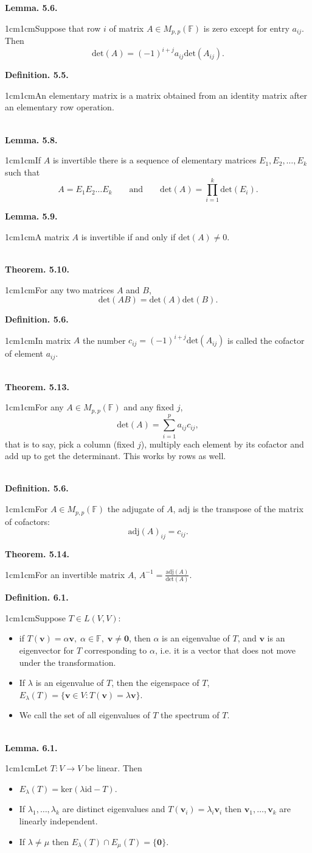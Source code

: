 \documentclass{article}
\newcommand{\vect}[1]{\mathbf{#1}}
\newcommand{\definition}[2]{\textbf{Definition. #1.}\begin{adjustwidth}{1cm}{1cm}#2\end{adjustwidth}}
\newcommand{\theorem}[2]{\textbf{Theorem. #1.}\begin{adjustwidth}{1cm}{1cm}#2\end{adjustwidth}}
\newcommand{\lemma}[2]{\textbf{Lemma. #1.}\begin{adjustwidth}{1cm}{1cm}#2\end{adjustwidth}}
\begin{document}
\lemma{5.6}{Suppose that row $i$ of matrix $A \in M_{p,p}(\mathbb{F})$ is zero except for entry $a_{ij}$. Then \[ \text{det}(A) = (-1)^{i+j} a_{ij} \text{det}(A_{ij}). \]}
\definition{5.5}{An elementary matrix is a matrix obtained from an identity matrix after an elementary row operation.}~\\
\lemma{5.8}{If $A$ is invertible there is a sequence of elementary matrices $E_1, E_2, \ldots, E_k$ such that \[ A = E_1 E_2 \ldots E_k \qquad \text{and} \qquad \text{det}(A) = \prod_{i=1}^k \text{det}(E_i). \]}\newpage
\lemma{5.9}{A matrix $A$ is invertible if and only if $\text{det}(A) \neq 0$.}~\\
\theorem{5.10}{For any two matrices $A$ and $B$, \[ \text{det}(AB) = \text{det}(A) \text{det}(B). \]}
\definition{5.6}{In matrix $A$ the number $c_{ij} = (-1)^{i + j} \text{det}(A_{ij})$ is called the cofactor of element $a_{ij}$.}~\\
\theorem{5.13}{For any $A \in M_{p,p}(\mathbb{F})$ and any fixed $j$, \[\text{det}(A) = \sum_{i=1}^p a_{ij}c_{ij},\]that is to say, pick a column (fixed $j$), multiply each element by its cofactor and add up to get the determinant. This works by rows as well.}~\\
\definition{5.6}{For $A \in M_{p,p}(\mathbb{F})$ the adjugate of $A$, $\text{adj}$ is the transpose of the matrix of cofactors: \[ \text{adj}(A)_{ij} = c_{ij}. \]}
\theorem{5.14}{For an invertible matrix $A$, $A^{-1} = \frac{\text{adj}(A)}{\text{det}(A)}$.}\newpage
\definition{6.1}{Suppose $T \in L(V,V)$:
\begin{itemize}
  \item if $T(\vect{v}) = \alpha \vect{v}, \; \alpha \in \mathbb{F}, \; \vect{v} \neq \vect{0}$, then $\alpha$ is an eigenvalue of $T$, and $\vect{v}$ is an eigenvector for $T$ corresponding to $\alpha$, i.e. it is a vector that does not move under the transformation.
  \item If $\lambda$ is an eigenvalue of $T$, then the eigenspace of $T$, $E_\lambda(T) = \{ \vect{v} \in V: T(\vect{v}) = \lambda \vect{v} \}$.
  \item We call the set of all eigenvalues of $T$ the spectrum of $T$.
\end{itemize}}~\\
\lemma{6.1}{Let $T: V \rightarrow V$ be linear. Then
\begin{itemize}
  \item $E_\lambda(T) = \text{ker}(\lambda \text{id}-T)$.
  \item If $\lambda_1, \ldots, \lambda_k$ are distinct eigenvalues and $T(\vect{v}_i) = \lambda_i \vect{v}_i$ then $\vect{v}_1, \ldots, \vect{v}_k$ are linearly independent.
  \item If $\lambda \neq \mu$ then $E_\lambda(T) \cap E_\mu(T) = \{ \vect{0} \}$.
\end{itemize}}~\\
\end{document}
